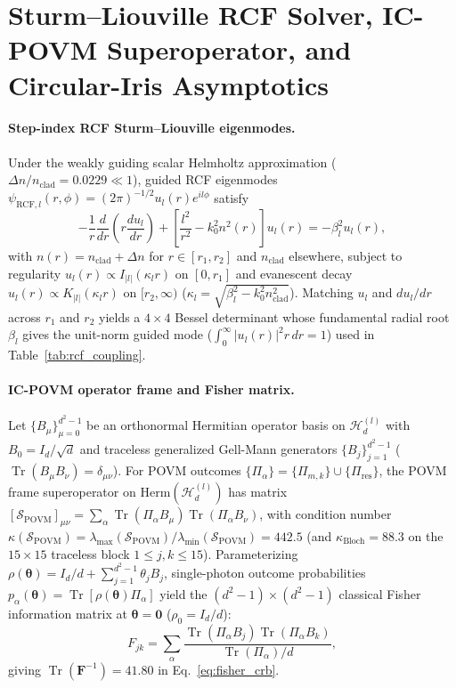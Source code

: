 \documentclass[aps,pra,reprint,nofootinbib,floatfix,longbibliography]{revtex4-2}
\newcommand{\abs}[1]{\lvert #1 \rvert}
\begin{document}
\appendix

\section{Sturm--Liouville RCF Solver, IC-POVM Superoperator, and Circular-Iris Asymptotics}
\label{app:methods}

\paragraph*{Step-index RCF Sturm--Liouville eigenmodes.}
Under the weakly guiding scalar Helmholtz approximation ($\Delta n / n_{\mathrm{clad}} = 0.0229 \ll 1$), guided RCF eigenmodes $\psi_{\mathrm{RCF},l}(r,\phi) = (2\pi)^{-1/2} u_l(r) e^{il\phi}$ satisfy
\begin{equation}
-\frac{1}{r}\frac{d}{dr}\!\left(r\frac{du_l}{dr}\right) + \left[\frac{l^2}{r^2} - k_0^2 n^2(r)\right] u_l(r) = -\beta_l^2 u_l(r),
\label{eq:app_sl_ode}
\end{equation}
with $n(r) = n_{\mathrm{clad}} + \Delta n$ for $r \in [r_1, r_2]$ and $n_{\mathrm{clad}}$ elsewhere, subject to regularity $u_l(r) \propto I_{\abs{l}}(\kappa_l r)$ on $[0,r_1]$ and evanescent decay $u_l(r) \propto K_{\abs{l}}(\kappa_l r)$ on $[r_2,\infty)$ ($\kappa_l = \sqrt{\beta_l^2 - k_0^2 n_{\mathrm{clad}}^2}$). Matching $u_l$ and $du_l/dr$ across $r_1$ and $r_2$ yields a $4\times 4$ Bessel determinant whose fundamental radial root $\beta_l$ gives the unit-norm guided mode ($\int_0^\infty \abs{u_l(r)}^2 r\,dr = 1$) used in Table~\ref{tab:rcf_coupling}.

\paragraph*{IC-POVM operator frame and Fisher matrix.}
Let $\{B_\mu\}_{\mu=0}^{d^2-1}$ be an orthonormal Hermitian operator basis on $\mathcal{H}_d^{(l)}$ with $B_0 = I_d/\sqrt{d}$ and traceless generalized Gell-Mann generators $\{B_j\}_{j=1}^{d^2-1}$ ($\operatorname{Tr}(B_\mu B_\nu) = \delta_{\mu\nu}$). For POVM outcomes $\{\Pi_\alpha\} = \{\Pi_{m,k}\} \cup \{\Pi_{\mathrm{res}}\}$, the POVM frame superoperator on $\mathrm{Herm}(\mathcal{H}_d^{(l)})$ has matrix $[\mathcal{S}_{\mathrm{POVM}}]_{\mu\nu} = \sum_\alpha \operatorname{Tr}(\Pi_\alpha B_\mu)\operatorname{Tr}(\Pi_\alpha B_\nu)$, with condition number $\kappa(\mathcal{S}_{\mathrm{POVM}}) = \lambda_{\max}(\mathcal{S}_{\mathrm{POVM}})/\lambda_{\min}(\mathcal{S}_{\mathrm{POVM}}) = 442.5$ (and $\kappa_{\mathrm{Bloch}} = 88.3$ on the $15\times 15$ traceless block $1 \le j,k \le 15$). Parameterizing $\rho(\boldsymbol{\theta}) = I_d/d + \sum_{j=1}^{d^2-1}\theta_j B_j$, single-photon outcome probabilities $p_\alpha(\boldsymbol{\theta}) = \operatorname{Tr}[\rho(\boldsymbol{\theta})\Pi_\alpha]$ yield the $(d^2-1)\times(d^2-1)$ classical Fisher information matrix at $\boldsymbol{\theta} = \mathbf{0}$ ($\rho_0 = I_d/d$):
\begin{equation}
F_{jk} = \sum_\alpha \frac{\operatorname{Tr}(\Pi_\alpha B_j)\operatorname{Tr}(\Pi_\alpha B_k)}{\operatorname{Tr}(\Pi_\alpha)/d},
\label{eq:app_fisher}
\end{equation}
giving $\operatorname{Tr}(\mathbf{F}^{-1}) = 41.80$ in Eq.~\eqref{eq:fisher_crb}.
\end{document}
